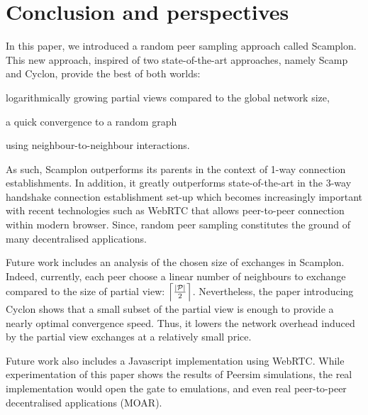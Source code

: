 
\section{Conclusion and perspectives}
\label{sec:conclusion}

In this paper, we introduced a random peer sampling approach called Scamplon.
This new approach, inspired of two state-of-the-art approaches, namely Scamp
and Cyclon, provide the best of both worlds:
\begin{inparaenum}
\item logarithmically growing partial views compared to the global network
  size,
\item a quick convergence to a random graph
\item using neighbour-to-neighbour interactions.
\end{inparaenum}
As such, Scamplon outperforms its parents in the context of 1-way connection
establishments. In addition, it greatly outperforms state-of-the-art in the
3-way handshake connection establishment set-up which becomes increasingly
important with recent technologies such as WebRTC that allows peer-to-peer
connection within modern browser. Since, random peer sampling constitutes the
ground of many decentralised applications.

Future work includes an analysis of the chosen size of exchanges in
Scamplon. Indeed, currently, each peer choose a linear number of neighbours to
exchange compared to the size of partial view:
$\left\lceil |\mathcal{P}|\over{2} \right\rceil$. Nevertheless, the paper
introducing Cyclon shows that a small subset of the partial view is enough to
provide a nearly optimal convergence speed. Thus, it lowers the network
overhead induced by the partial view exchanges at a relatively small price.

Future work also includes a Javascript implementation using WebRTC. While
experimentation of this paper shows the results of Peersim simulations, the
real implementation would open the gate to emulations, and even real
peer-to-peer decentralised applications (MOAR).

